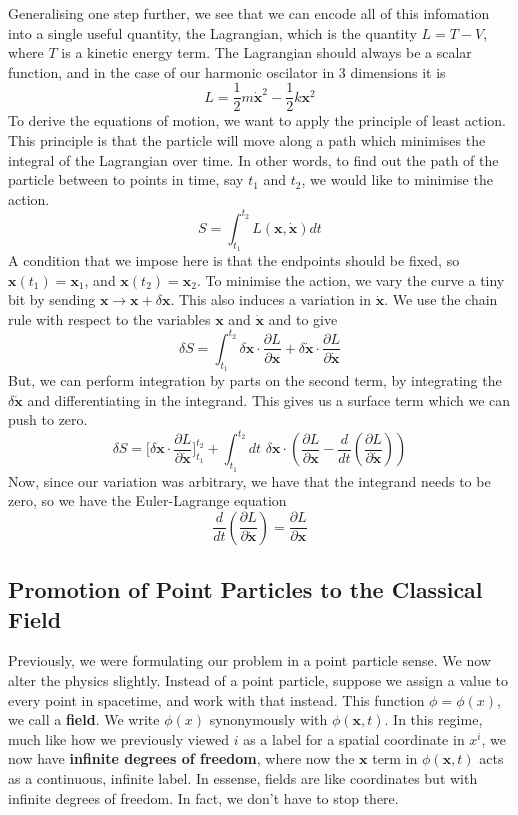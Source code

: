 \documentclass[11pt, oneside]{article}   	%
\theoremstyle{newline}
\theoremstyle{newline}
\theoremstyle{newline}
\theoremstyle{newline}
\theoremstyle{newline}
\begin{document}
Generalising one step further, we see that we can encode all of this infomation into a single useful quantity, the Lagrangian, which is the quantity $L = T - V$, where $T$ is a kinetic energy term. The Lagrangian should always be a scalar function, and in the case of our harmonic oscilator in 3 dimensions it is \[ 
L = 	\frac{1 } {2} m \dot{ \mathbf{x}}^ 2 - \frac{1}{ 2} k \mathbf{x}^2 \]   
To derive the equations of motion, we want to apply the principle of least action. This principle is that the particle will move along a path which minimises the integral of the Lagrangian over time. In other words, to find out the path of the particle between to points in time, say $t_1$ and $t_2$, we would like to minimise the action.
\[ S = \int_{t_1}^ {t_2} L( \mathbf{ x} , \dot{\mathbf{x} } )   dt \] 
A condition that we impose here is that the endpoints should be fixed, so $\mathbf{x}( t_1 ) = \mathbf{ x} _1$, and $ \mathbf{x}( t_2 ) = \mathbf{x}_2 $.  
To minimise the action, we vary the curve a tiny bit by sending $\mathbf{x} \rightarrow \mathbf{x} + \delta \mathbf{ x} $. This also induces a variation in $\dot{\mathbf{x} } $. We use the chain rule with respect to the variables $\mathbf{x} $ and $\dot{\mathbf{x}} $ and to give \[ 
\delta S = \int_{ t_1}^{t_2} \delta \mathbf{x} \cdot \frac{ \partial L}{ \partial \mathbf{x} } + \delta \dot{\mathbf{x}}\cdot  \frac{ \partial L }{ \partial \dot{\mathbf{x}}} \] 
But, we can perform integration by parts on the second term, by integrating the $\delta \dot{\mathbf{x}} $ and differentiating in the integrand. This gives us a surface term which we can push to zero.
\[ \delta S = \big [ \delta \mathbf{ x} \cdot \frac{ \partial L } { \partial \dot{\mathbf{x}}}   \big ]^{t_2}_{t_1 }  + \int_{t_1}^{t_2} dt \, \, \delta \mathbf{x} \cdot \left( \frac{ \partial L }{ \partial \mathbf{x}} - \frac{d}{dt} \left( \frac{ \partial L }{\partial \dot{\mathbf{x}}} \right) \right)   \] 
Now, since our variation was arbitrary, we have that the integrand needs to be zero, so we have the Euler-Lagrange equation \[ \frac{ d} {dt } \left( \frac{ \partial L } { \partial \dot{ \mathbf{x}} } \right) = \frac{ \partial L }{ \partial \mathbf{x} } \] 

\subsection{Promotion of Point Particles to the Classical Field} 
Previously, we were formulating our problem in a point particle sense. We now alter the physics slightly. Instead of a point particle, suppose we assign a value to every point in spacetime, and work with that instead. This function $\phi = \phi(x) $, we call a \textbf{field}. We write $\phi( x)$ synonymously with $\phi ( \mathbf{x} , t) $. In this regime, much like how we previously viewed $i$ as a label for a spatial coordinate in $x^i$, we now have 
\textbf{infinite degrees of freedom}, where now the $\mathbf{x}$ term in $\phi( \mathbf{x}, t)$ acts as a continuous, infinite label. In essense, fields are like coordinates but with infinite degrees of freedom. In fact, we don't have to stop there. 
\end{document}
